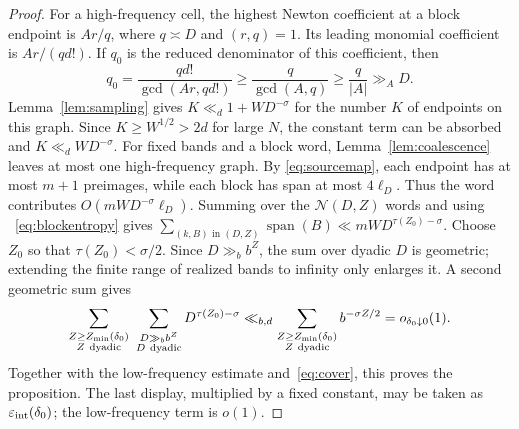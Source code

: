 \documentclass[a4paper,10pt]{amsart}
\theoremstyle{remark}
\newcommand{\Span}{\operatorname{span}}
\begin{document}
\begin{proof}
For a high-frequency cell, the highest Newton coefficient at a block endpoint
is $Ar/q$, where $q\asymp D$ and $(r,q)=1$. Its leading monomial coefficient
is $Ar/(qd!)$. If $q_0$ is the reduced denominator of this coefficient, then
\[
 q_0=\frac{qd!}{\gcd(Ar,qd!)}
 \ge\frac q{\gcd(A,q)}
 \ge\frac q{|A|}
 \gg_A D.
\]
Lemma~\ref{lem:sampling} gives $K\ll_d1+WD^{-\sigma}$ for the number $K$ of
endpoints on this graph. Since $K\ge W^{1/2}>2d$ for large $N$, the constant
term can be absorbed and $K\ll_dWD^{-\sigma}$. For fixed bands and a block
word, Lemma~\ref{lem:coalescence} leaves at most one high-frequency graph. By
\eqref{eq:sourcemap}, each endpoint has at most $m+1$ preimages, while each
block has span at most $4\ell_D$. Thus the word contributes
$O(mWD^{-\sigma}\ell_D)$. Summing over the $\mathcal N(D,Z)$ words and using
~\eqref{eq:blockentropy} gives
$\sum_{(k,B)\text{ in }(D,Z)}\Span(B)
\ll mW D^{\tau(Z_0)-\sigma}$.
Choose $Z_0$ so that $\tau(Z_0)<\sigma/2$. Since $D\gg_b b^Z$, the sum over
dyadic $D$ is geometric; extending the finite range of realized bands to
infinity only enlarges it. A second geometric sum gives
\[
 \sum_{\substack{Z\ge Z_{\min}(\delta_0)\\ Z\ {\rm dyadic}}}
 \ \sum_{\substack{D\gg_b b^Z\\ D\ {\rm dyadic}}}
 D^{\tau(Z_0)-\sigma}
 \ll_{b,d}
 \sum_{\substack{Z\ge Z_{\min}(\delta_0)\\ Z\ {\rm dyadic}}}
 b^{-\sigma Z/2}=o_{\delta_0\downarrow0}(1).
\]
Together with the low-frequency estimate and~\eqref{eq:cover}, this proves the
proposition. The last display, multiplied by a fixed constant, may be taken
as $\varepsilon_{\rm int}(\delta_0)$; the low-frequency term is $o(1)$.
\end{proof}
\end{document}
